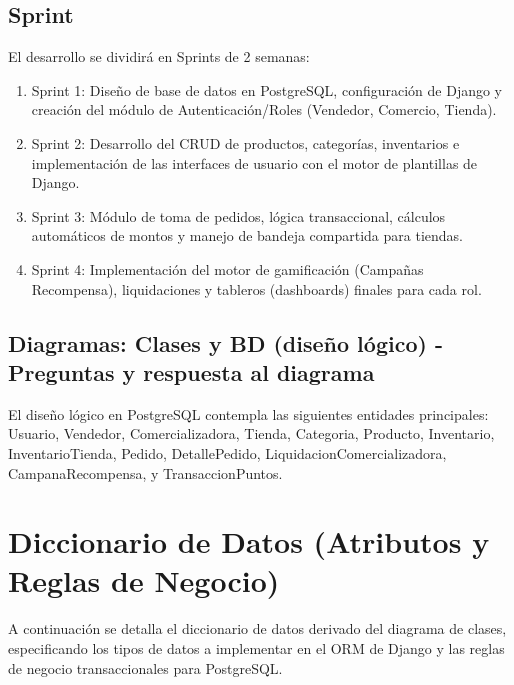 \documentclass{article}
\begin{document}
\subsection{Sprint} 
El desarrollo se dividirá en Sprints de 2 semanas: 
\begin{enumerate}
    \item Sprint 1: Diseño de base de datos en PostgreSQL, configuración de Django y creación del módulo de Autenticación/Roles (Vendedor, Comercio, Tienda). 
    \item Sprint 2: Desarrollo del CRUD de productos, categorías, inventarios e implementación de las interfaces de usuario con el motor de plantillas de Django. 
    \item Sprint 3: Módulo de toma de pedidos, lógica transaccional, cálculos automáticos de montos y manejo de bandeja compartida para tiendas. 
    \item Sprint 4: Implementación del motor de gamificación (Campañas Recompensa), liquidaciones y tableros (dashboards) finales para cada rol. 
\end{enumerate}

\subsection{Diagramas: Clases y BD (diseño lógico) - Preguntas y respuesta al diagrama} 
El diseño lógico en PostgreSQL contempla las siguientes entidades principales: Usuario, Vendedor, Comercializadora, Tienda, Categoria, Producto, Inventario, InventarioTienda, Pedido, DetallePedido, LiquidacionComercializadora, CampanaRecompensa, y TransaccionPuntos. 

\section{Diccionario de Datos (Atributos y Reglas de Negocio)}

A continuación se detalla el diccionario de datos derivado del diagrama de clases, especificando los tipos de datos a implementar en el ORM de Django y las reglas de negocio transaccionales para PostgreSQL.
\end{document}
